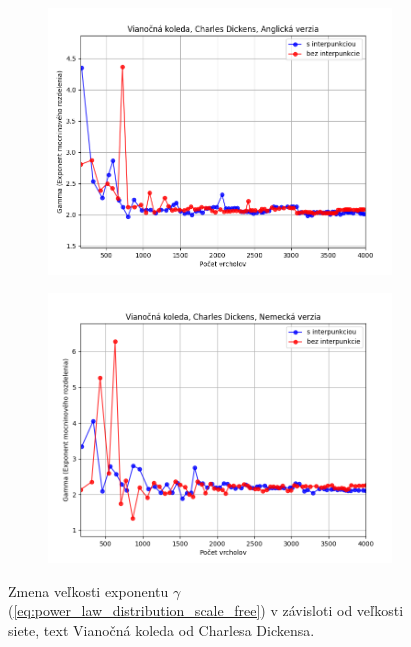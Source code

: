 \begin{figure}[htbp]
    \centering
    \begin{subfigure}[b]{0.9\textwidth}
        \includegraphics[width=\textwidth]{images/Growth/Screenshot_13.png}
    \end{subfigure}

    \vspace{0.3cm}

    \begin{subfigure}[b]{0.9\textwidth}
        \includegraphics[width=\textwidth]{images/Growth/Screenshot_14.png}
    \end{subfigure}
    
    \vspace{0.3cm}
    \caption{Zmena veľkosti exponentu $\gamma$ (\ref{eq:power_law_distribution_scale_free}) v závisloti od veľkosti siete, text Vianočná koleda od Charlesa Dickensa.}\label{fig:growthKoleda}
\end{figure}

